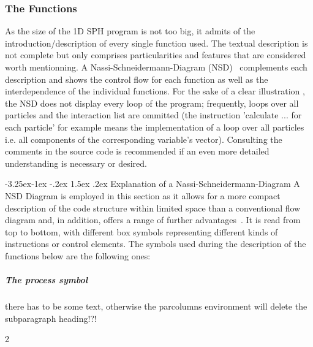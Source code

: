 \documentclass{report}
\makeatletter
\renewcommand\paragraph{\@startsection{paragraph}{4}{\z@}%
  {-3.25ex\@plus -1ex \@minus -.2ex}%
  {1.5ex \@plus .2ex}%
  {\normalfont\normalsize\bfseries}}
\makeatother
\begin{document}
\subsubsection{The Functions}

As the size of the 1D SPH program is not too big, it admits of the introduction/description of every single function used. The textual description is not complete but only comprises particularities and features that are considered worth mentionning. A Nassi-Schneidermann-Diagram (NSD)~\cite{Nassi???} complements each description and shows the control flow for each function as well as the interdependence of the individual functions. For the sake of a clear illustration , the NSD does not display every loop of the program; frequently, loops over all particles and the interaction list are ommitted (the instruction 'calculate ... for each particle' for example means the implementation of a loop over all particles i.e. all components of the corresponding variable's vector).  Consulting the comments in the source code is recommended if an even more detailed understanding is necessary or desired.

\paragraph{Explanation of a Nassi-Schneidermann-Diagram}
A NSD Diagram is employed in this section as it allows for a more compact description of the code structure within limited space than a conventional flow diagram and, in addition, offers a range of further advantages~\cite{Nassi???}. It is read from top to bottom, with different box symbols representing different kinds of instructions or control elements. The symbols used during the description of the functions below are the following ones:

\subparagraph{The process symbol}
there has to be some text, otherwise the parcolumns environment will delete the subparagraph heading!?!
\vspace{5mm}
\begin{parcolumns} [colwidths={1=60mm,2=35mm}] {2}  
 

\colplacechunks
\end{parcolumns}
\end{document}
